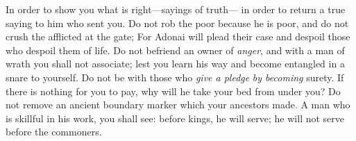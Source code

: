 \begin{biblechapter}
\verse In order to show you what is right—sayings of truth— 
in order to return a true saying to him who sent you.
\verse Do not rob the poor because he is poor, 
and do not crush the afflicted at the gate;
\verse For Adonai will plead their case 
and despoil those who despoil them of life.
\verse Do not befriend an owner of \textit{anger}, 
and with a man of wrath you shall not associate;
\verse lest you learn his way 
and become entangled in a snare to yourself.
\verse Do not be with those who \textit{give a pledge} 
\textit{by becoming} surety.
\verse If there is nothing for you to pay, 
why will he take your bed from under you?
\verse Do not remove an ancient boundary marker 
which your ancestors made.
\verse A man who is skillful in his work, you shall see: 
before kings, he will serve; 
he will not serve before the commoners.
\end{biblechapter}

